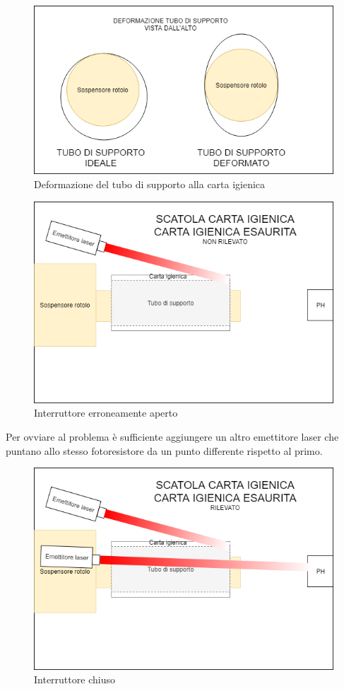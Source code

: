 \documentclass[12pt]{article}
\begin{document}
 \begin{figure}[h!]
\centering
	\includegraphics[scale=0.55]{img/parteLocale/DeformazioneTubo.png}  
    \caption{Deformazione del tubo di supporto alla carta igienica}
\end{figure}
 \begin{figure}[h!]
\centering
	\includegraphics[scale=0.55]{img/parteLocale/ProblemaDeformazione.png}  
    \caption{Interruttore erroneamente aperto}
\end{figure}
\newpage
Per ovviare al problema è sufficiente aggiungere un altro emettitore laser che puntano allo stesso fotoresistore da un punto differente rispetto al primo.\\
 \begin{figure}[h!]
\centering
	\includegraphics[scale=0.55]{img/parteLocale/SoluzioneDeformazione.png}  
    \caption{Interruttore chiuso}
\end{figure}
\end{document}
